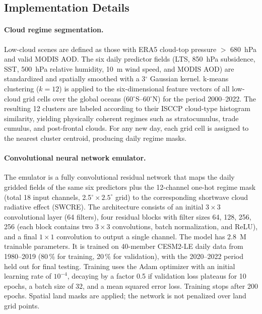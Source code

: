 \documentclass{article}
\begin{document}
\subsection{Implementation Details}
\paragraph{Cloud regime segmentation.}
Low-cloud scenes are defined as those with ERA5 cloud-top pressure $>$ 680~hPa and valid MODIS AOD. The six daily predictor fields (LTS, 850~hPa subsidence, SST, 500~hPa relative humidity, 10~m wind speed, and MODIS AOD) are standardized and spatially smoothed with a 3$^\circ$ Gaussian kernel. k-means clustering ($k=12$) is applied to the six-dimensional feature vectors of all low-cloud grid cells over the global oceans (60$^\circ$S--60$^\circ$N) for the period 2000--2022. The resulting 12 clusters are labeled according to their ISCCP cloud-type histogram similarity, yielding physically coherent regimes such as stratocumulus, trade cumulus, and post-frontal clouds. For any new day, each grid cell is assigned to the nearest cluster centroid, producing daily regime masks.

\paragraph{Convolutional neural network emulator.}
The emulator is a fully convolutional residual network that maps the daily gridded fields of the same six predictors plus the 12-channel one-hot regime mask (total 18 input channels, 2.5$^\circ\!\times\!2.5^\circ$ grid) to the corresponding shortwave cloud radiative effect (SWCRE). The architecture consists of an initial $3\!\times\!3$ convolutional layer (64 filters), four residual blocks with filter sizes 64, 128, 256, 256 (each block contains two $3\!\times\!3$ convolutions, batch normalization, and ReLU), and a final $1\!\times\!1$ convolution to output a single channel. The model has 2.8~M trainable parameters. It is trained on 40-member CESM2-LE daily data from 1980--2019 (80\,\% for training, 20\,\% for validation), with the 2020--2022 period held out for final testing. Training uses the Adam optimizer with an initial learning rate of $10^{-4}$, decaying by a factor 0.5 if validation loss plateaus for 10 epochs, a batch size of 32, and a mean squared error loss. Training stops after 200 epochs. Spatial land masks are applied; the network is not penalized over land grid points.
\end{document}
